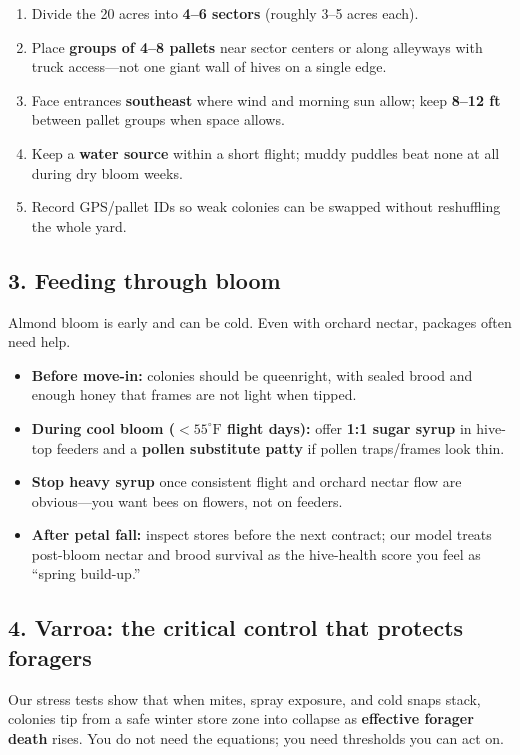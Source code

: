 \documentclass[11pt]{article}
\begin{document}
\begin{enumerate}[leftmargin=1.2em]
  \item Divide the 20 acres into \textbf{4--6 sectors} (roughly
        3--5 acres each).
  \item Place \textbf{groups of 4--8 pallets} near sector centers or
        along alleyways with truck access---not one giant wall of hives
        on a single edge.
  \item Face entrances \textbf{southeast} where wind and morning sun
        allow; keep \textbf{8--12 ft} between pallet groups when space
        allows.
  \item Keep a \textbf{water source} within a short flight; muddy
        puddles beat none at all during dry bloom weeks.
  \item Record GPS/pallet IDs so weak colonies can be swapped without
        reshuffling the whole yard.
\end{enumerate}

\subsection*{3. Feeding through bloom}
Almond bloom is early and can be cold. Even with orchard nectar, packages
often need help.

\begin{itemize}[leftmargin=1.2em]
  \item \textbf{Before move-in:} colonies should be queenright, with
        sealed brood and enough honey that frames are not light when
        tipped.
  \item \textbf{During cool bloom (\(<55^\circ\mathrm{F}\) flight days):}
        offer \textbf{1:1 sugar syrup} in hive-top feeders and a
        \textbf{pollen substitute patty} if pollen traps/frames look
        thin.
  \item \textbf{Stop heavy syrup} once consistent flight and orchard
        nectar flow are obvious---you want bees on flowers, not on
        feeders.
  \item \textbf{After petal fall:} inspect stores before the next
        contract; our model treats post-bloom nectar and brood survival
        as the hive-health score you feel as ``spring build-up.''
\end{itemize}

\subsection*{4. Varroa: the critical control that protects foragers}
Our stress tests show that when mites, spray exposure, and cold snaps
stack, colonies tip from a safe winter store zone into collapse as
\textbf{effective forager death} rises. You do not need the equations;
you need thresholds you can act on.
\end{document}
